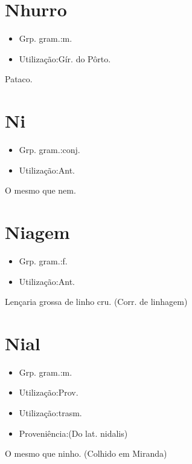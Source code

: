 \section{Nhurro}
\begin{itemize}
\item {Grp. gram.:m.}
\end{itemize}
\begin{itemize}
\item {Utilização:Gír. do Pôrto.}
\end{itemize}
Pataco.
\section{Ni}
\begin{itemize}
\item {Grp. gram.:conj.}
\end{itemize}
\begin{itemize}
\item {Utilização:Ant.}
\end{itemize}
O mesmo que \textunderscore nem\textunderscore .
\section{Niagem}
\begin{itemize}
\item {Grp. gram.:f.}
\end{itemize}
\begin{itemize}
\item {Utilização:Ant.}
\end{itemize}
Lençaria grossa de linho cru.
(Corr. de \textunderscore linhagem\textunderscore )
\section{Nial}
\begin{itemize}
\item {Grp. gram.:m.}
\end{itemize}
\begin{itemize}
\item {Utilização:Prov.}
\end{itemize}
\begin{itemize}
\item {Utilização:trasm.}
\end{itemize}
\begin{itemize}
\item {Proveniência:(Do lat. \textunderscore nidalis\textunderscore )}
\end{itemize}
O mesmo que \textunderscore ninho\textunderscore . (Colhido em Miranda)
